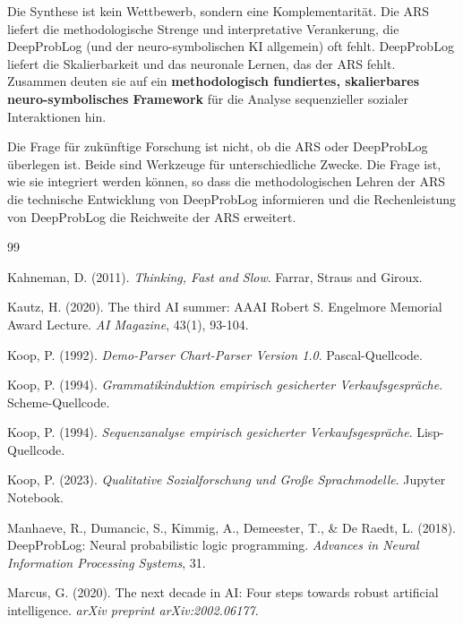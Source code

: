 \documentclass[12pt,a4paper]{article}
\begin{document}
Die Synthese ist kein Wettbewerb, sondern eine Komplementarität. Die ARS liefert 
die methodologische Strenge und interpretative Verankerung, die DeepProbLog 
(und der neuro-symbolischen KI allgemein) oft fehlt. DeepProbLog liefert die 
Skalierbarkeit und das neuronale Lernen, das der ARS fehlt. Zusammen deuten 
sie auf ein \textbf{methodologisch fundiertes, skalierbares neuro-symbolisches 
Framework} für die Analyse sequenzieller sozialer Interaktionen hin.

Die Frage für zukünftige Forschung ist nicht, ob die ARS oder DeepProbLog 
überlegen ist. Beide sind Werkzeuge für unterschiedliche Zwecke. Die Frage 
ist, wie sie integriert werden können, so dass die methodologischen Lehren 
der ARS die technische Entwicklung von DeepProbLog informieren und die 
Rechenleistung von DeepProbLog die Reichweite der ARS erweitert.

\newpage
\begin{thebibliography}{99}

Kahneman, D. (2011). \textit{Thinking, Fast and Slow}. Farrar, Straus and Giroux.

Kautz, H. (2020). The third AI summer: AAAI Robert S. Engelmore Memorial Award 
Lecture. \textit{AI Magazine}, 43(1), 93-104.

Koop, P. (1992). \textit{Demo-Parser Chart-Parser Version 1.0}. Pascal-Quellcode.

Koop, P. (1994). \textit{Grammatikinduktion empirisch gesicherter 
Verkaufsgespräche}. Scheme-Quellcode.

Koop, P. (1994). \textit{Sequenzanalyse empirisch gesicherter 
Verkaufsgespräche}. Lisp-Quellcode.

Koop, P. (2023). \textit{Qualitative Sozialforschung und Große Sprachmodelle}. 
Jupyter Notebook.

Manhaeve, R., Dumancic, S., Kimmig, A., Demeester, T., \& De Raedt, L. (2018). 
DeepProbLog: Neural probabilistic logic programming. \textit{Advances in 
Neural Information Processing Systems}, 31.

Marcus, G. (2020). The next decade in AI: Four steps towards robust artificial 
intelligence. \textit{arXiv preprint arXiv:2002.06177}.

\end{thebibliography}
\end{document}

